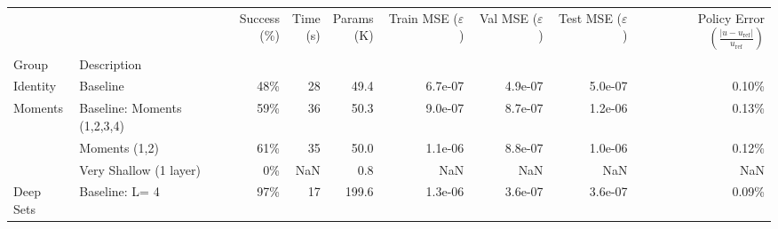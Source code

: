 \begin{tabular}{llrrrrrrr}
\toprule
          &                                                                     & \shortstack{Success \\(\%)} & \shortstack{Time \\ (s)} & \shortstack{Params\\ (K)} & \shortstack{Train MSE \\ ($\varepsilon$)} & \shortstack{Val MSE \\ ($\varepsilon$)} & \shortstack{Test MSE \\ ($\varepsilon$)} & \shortstack{Policy Error\\ $\left(\frac{|u - u_{\text{ref}}|}{u_{\text{ref}}}\right)$} \\
Group & Description &                             &                          &                           &                                           &                                         &                                          &                                                                                        \\
\midrule
Identity & Baseline &                        48\% &                       28 &                      49.4 &                                   6.7e-07 &                                 4.9e-07 &                                  5.0e-07 &                                             0.10\% \\
\midrule
\multirow{3}{*}{Moments} & Baseline: Moments (1,2,3,4) &                        59\% &                       36 &                      50.3 &                                   9.0e-07 &                                 8.7e-07 &                                  1.2e-06 &                                             0.13\% \\
          & Moments (1,2) &                        61\% &                       35 &                      50.0 &                                   1.1e-06 &                                 8.8e-07 &                                  1.0e-06 &                                             0.12\% \\
          & Very Shallow (1 layer) &                         0\% &                      NaN &                       0.8 &                                       NaN &                                     NaN &                                      NaN &                                                NaN \\
\cline{1-9}
\multirow{5}{*}{Deep Sets} & Baseline: L= 4 &                        97\% &                       17 &                     199.6 &                                   1.3e-06 &                                 3.6e-07 &                                  3.6e-07 &                                             0.09\% \\

\end{tabular}
